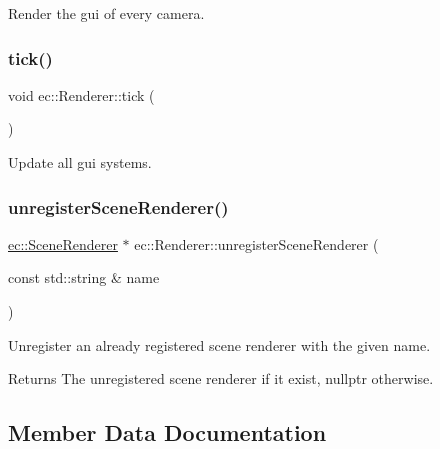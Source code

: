Render the gui of every camera. 

\mbox{\label{classec_1_1_renderer_a6dcc619251e6e4ec7f088567cba6fd57}} 
\subsubsection{\texorpdfstring{tick()}{tick()}}
{\footnotesize\ttfamily void ec\+::\+Renderer\+::tick (\begin{DoxyParamCaption}{ }\end{DoxyParamCaption})}



Update all gui systems. 

\mbox{\label{classec_1_1_renderer_a5c853ee4c34b069cc8142db8409abac6}} 
\subsubsection{\texorpdfstring{unregister\+Scene\+Renderer()}{unregisterSceneRenderer()}}
{\footnotesize\ttfamily \mbox{\hyperlink{classec_1_1_scene_renderer}{ec\+::\+Scene\+Renderer}} $\ast$ ec\+::\+Renderer\+::unregister\+Scene\+Renderer (\begin{DoxyParamCaption}\item[{const std\+::string \&}]{name }\end{DoxyParamCaption})}



Unregister an already registered scene renderer with the given name. 

\begin{DoxyReturn}{Returns}
The unregistered scene renderer if it exist, nullptr otherwise. 
\end{DoxyReturn}


\subsection{Member Data Documentation}
\mbox{\label{classec_1_1_renderer_a00afed952025d62a654a5f961a55b342}} 
